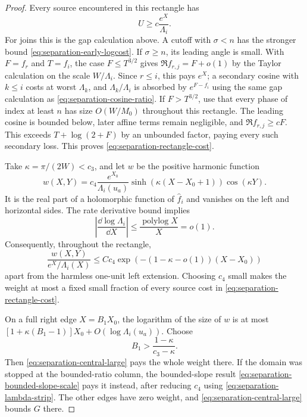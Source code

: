 \begin{proof}
Every source encountered in this rectangle has
\begin{equation}\label{eq:separation-rectangle-cost}
 U\geq c\frac{e^X}{\Lambda_i}.
\end{equation}
For joins this is the gap calculation above.  A cutoff with
$\sigma<n$ has the stronger bound
\eqref{eq:separation-early-logcost}.  If $\sigma\geq n$,
its leading angle is small.  With $F=f_r$ and $T=f_i$, the
case $F\leq T^{3/2}$ gives $\Re f_{r,j}=F+o(1)$ by the
Taylor calculation on the scale $W/\Lambda_i$.  Since
$r\leq i$, this pays $e^X$; a secondary cosine with $k\leq i$
costs at worst $\Lambda_k$, and
$\Lambda_k/\Lambda_i$ is absorbed by $e^{F-f_i}$ using
the same gap calculation as
\eqref{eq:separation-cosine-ratio}.  If $F>T^{3/2}$, use
that every phase of index at least $n$ has size
$O(W/M_0)$ throughout this rectangle.  The leading cosine
is bounded below, later affine terms remain negligible,
and $\Re f_{r,j}\geq cF$.  This exceeds
$T+\log(2+F)$ by an unbounded factor, paying every such
secondary loss.  This proves
\eqref{eq:separation-rectangle-cost}.

Take $\kappa=\pi/(2W)<c_3$, and let $w$ be the positive
harmonic function
\begin{equation}\label{eq:separation-strip-weight}
 w(X,Y)=c_4\frac{e^{X_0}}{\Lambda_i(u_a)}
      \sinh(\kappa(X-X_0+1))\cos(\kappa Y).
\end{equation}
It is the real part of a holomorphic function of
$\widehat f_i$ and vanishes on the left and horizontal sides.
The rate derivative bound implies
\begin{equation}\label{eq:separation-lambda-strip}
 \left|\frac{\dd\log\Lambda_i}{\dd X}\right|
      \leq\frac{\operatorname{polylog}X}{X}=o(1).
\end{equation}
Consequently, throughout the rectangle,
\[
 \frac{w(X,Y)}{e^X/\Lambda_i(X)}
 \leq Cc_4
       \exp(-(1-\kappa-o(1))(X-X_0))
\]
apart from the harmless one-unit left extension.  Choosing $c_4$
small makes the weight at most a fixed small fraction of every
source cost in \eqref{eq:separation-rectangle-cost}.

On a full right edge $X=B_1X_0$, the logarithm of the size of
$w$ is at most
$[1+\kappa(B_1-1)]X_0+O(\log\Lambda_i(u_a))$.
Choose
\begin{equation}\label{eq:separation-right-factor}
 B_1>\frac{1-\kappa}{c_3-\kappa}.
\end{equation}
Then \eqref{eq:separation-central-large} pays the whole
weight there.  If the domain was stopped at the bounded-ratio
column, the bounded-slope result
\eqref{eq:separation-bounded-slope-scale} pays it instead,
after reducing $c_4$ using
\eqref{eq:separation-lambda-strip}.  The other edges have
zero weight, and \eqref{eq:separation-central-large} bounds
$G$ there.


\end{proof}
